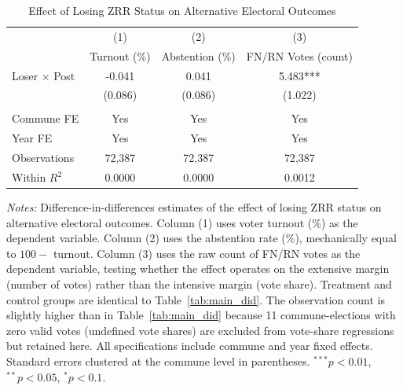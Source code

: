 \begin{table}[htbp]
\centering
\caption{Effect of Losing ZRR Status on Alternative Electoral Outcomes}
\label{tab:alt_outcomes}
\begin{tabular}{lccc}
\toprule
 & (1) & (2) & (3) \\
 & Turnout (\%) & Abstention (\%) & FN/RN Votes (count) \\
\midrule
Loser $\times$ Post & -0.041 & 0.041 & 5.483*** \\
 & (0.086) & (0.086) & (1.022) \\
 & & & \\
Commune FE & Yes & Yes & Yes \\
Year FE & Yes & Yes & Yes \\
\midrule
Observations & 72{,}387 & 72{,}387 & 72{,}387 \\
Within $R^2$ & 0.0000 & 0.0000 & 0.0012 \\
\bottomrule
\end{tabular}
\vspace{0.3em}
\parbox{\textwidth}{\footnotesize
\textit{Notes:} Difference-in-differences estimates of the effect of losing ZRR status on alternative electoral outcomes.
Column (1) uses voter turnout (\%) as the dependent variable.
Column (2) uses the abstention rate (\%), mechanically equal to $100 -$ turnout.
Column (3) uses the raw count of FN/RN votes as the dependent variable, testing whether the effect operates on the extensive margin (number of votes) rather than the intensive margin (vote share).
Treatment and control groups are identical to Table~\ref{tab:main_did}.
The observation count is slightly higher than in Table~\ref{tab:main_did} because 11 commune-elections with zero valid votes (undefined vote shares) are excluded from vote-share regressions but retained here.
All specifications include commune and year fixed effects. Standard errors clustered at the commune level in parentheses.
$^{***}p<0.01$, $^{**}p<0.05$, $^{*}p<0.1$.}
\end{table}
